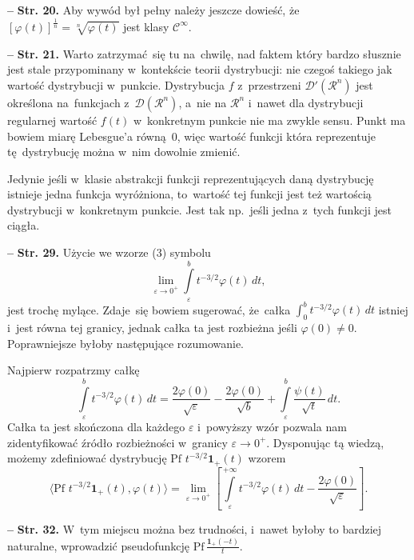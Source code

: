\documentclass[a4paper,11pt]{article}
\newcommand{\fr}{\frac}
\newcommand{\mr}{\mathrm}
\newcommand{\mc}{\mathcal}
\newcommand{\mbf}{\mathbf}
\newcommand{\ra}{\rightarrow}
\newcommand{\veps}{\varepsilon}
\newcommand{\vp}{\varphi}
\newcommand{\D}{\mc{D}}
\newcommand{\Rc}{\mc{R}}
\newcommand{\Cc}{\mc{C}}
\newcommand{\Lim}{\lim\limits}
\newcommand{\Cinfty}{\Cc^{ \infty }}
\newcommand{\Int}{\int\limits}
\newcommand{\lket}{\langle}
\newcommand{\rket}{\rangle}
\newcommand{\tb}{\textbf}
\newcommand{\noi}{\noindent}
\newcommand{\start}{\noi \tb{--} {}}
\newcommand{\Str}[1]{\tb{Str. #1.}}
\newcommand{\Pf}{\mr{Pf}\,}
\newcommand{\Rnc}{\Rc^{ n }}
\newcommand{\Hevp}{\mbf{1}_{ + }} %
\begin{document}
\start \Str{20} Aby wywód był pełny należy jeszcze dowieść,
że~$[ \vp( t ) ]^{ \fr{ 1 }{ n } } = \sqrt[ n ]{ \vp( t ) }$ jest
klasy $\Cinfty$.


\start \Str{21} Warto zatrzymać~się tu na~chwilę, nad faktem który
bardzo słusznie jest stale przypominany w~kontekście teorii
dystrybucji: nie czegoś takiego jak wartość dystrybucji w~punkcie.
Dystrybucja $f$ z~przestrzeni $\D'( \Rnc )$ jest określona
na~funkcjach z~$\D( \Rnc )$, a~nie na $\Rnc$ i~nawet dla dystrybucji
regularnej wartość $f( t )$ w~konkretnym punkcie nie ma zwykle sensu.
Punkt ma bowiem miarę Lebesgue'a równą~0, więc wartość funkcji która
reprezentuje tę~dystrybucję można w~nim dowolnie zmienić.

Jedynie jeśli w~klasie abstrakcji funkcji reprezentujących daną
dystrybucję istnieje jedna funkcja wyróżniona, to~wartość tej funkcji
jest też wartością dystrybucji w~konkretnym punkcie. Jest tak
np.~jeśli jedna z~tych funkcji jest ciągła.


\start \Str{29} Użycie we wzorze (3) symbolu
\begin{equation}
  \label{eq:Zem-s01-01}
  \Lim_{ \veps \ra 0^{ + } } \Int_{ \veps }^{ b } t^{ -3/2 } \vp( t ) \, dt,
\end{equation}
jest trochę mylące. Zdaje~się bowiem sugerować, że~całka
$\int_{ 0 }^{ b } t^{ -3/2 } \vp( t ) \, dt$ istniej i~jest równa tej
granicy, jednak całka ta jest rozbieżna jeśli $\vp( 0 ) \neq 0$.
Poprawniejsze byłoby następujące
rozumowanie. %

Najpierw rozpatrzmy całkę
\begin{equation}
  \label{eq:Zem-s01-02}
  \Int_{ \veps }^{ b } t^{ -3/2 } \vp( t ) \, dt
  = \fr{ 2 \vp( 0 ) }{ \sqrt{ \veps } } - \fr{ 2 \vp( 0 ) }{ \sqrt{ b } }
  + \Int_{ \veps }^{ b } \fr{ \psi( t ) }{ \sqrt{ t } } \, dt.
\end{equation}
Całka ta jest skończona dla każdego $\veps$ i~powyższy wzór pozwala
nam zidentyfikować źródło rozbieżności w~granicy $\veps \ra 0^{ + }$.
Dysponując tą wiedzą, możemy zdefiniować dystrybucję
$\Pf \, t^{ -3/2 } \Hevp( t )$ wzorem
\begin{equation}
  \label{eq:Zem-s01-03}
  \lket \Pf \, t^{ -3/2 } \Hevp( t ), \vp( t ) \rket = \Lim_{ \veps \ra 0^{ + } }
  \left[ \Int_{ \veps }^{ +\infty } t^{ -3/2 } \vp( t ) \, dt
    - \fr{ 2 \vp( 0 ) }{ \sqrt{ \veps } } \right].
\end{equation}


\start \Str{32} W~tym miejscu można bez trudności, i~nawet byłoby to
bardziej naturalne, wprowadzić pseudofunkcję
$\Pf \fr{ \Hevp( -t )}{ t }$.
\end{document}
